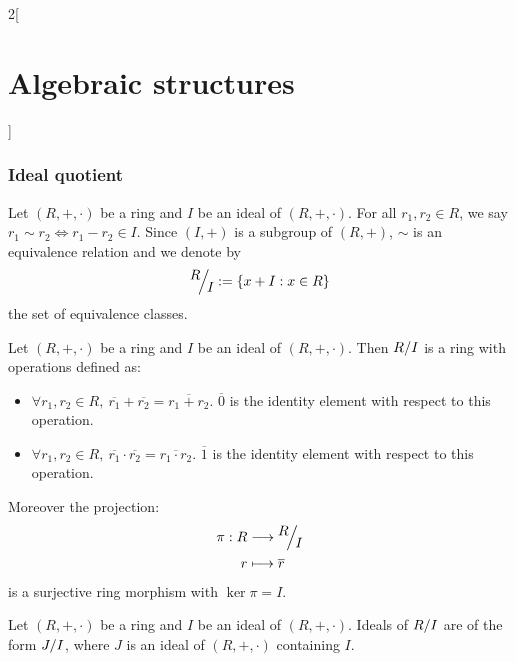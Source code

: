 \documentclass[../../../main.tex]{subfiles}
\begin{document}
\begin{multicols}{2}[\section{Algebraic structures}]
\subsubsection{Ideal quotient}
\begin{definition}
    Let $(R,+,\cdot)$ be a ring and $I$ be an ideal of $(R,+,\cdot)$. For all $r_1,r_2\in R$, we say $r_1\sim r_2\iff r_1-r_2\in I$. Since $(I,+)$ is a subgroup of $(R,+)$, $\sim$ is an equivalence relation and we denote by $$\quot{R}{I}:=\{x+I:x\in R\}$$ the set of equivalence classes.
\end{definition}
\begin{prop}
    Let $(R,+,\cdot)$ be a ring and $I$ be an ideal of $(R,+,\cdot)$. Then $\quot{R}{I}$ is a ring with operations defined as:
    \begin{itemize}
        \item $\forall r_1,r_2\in R,\ \overline{r_1}+\overline{r_2}=\overline{r_1+r_2}$. $\overline{0}$ is the identity element with respect to this operation.
        \item $\forall r_1,r_2\in R,\ \overline{r_1}\cdot\overline{r_2}=\overline{r_1\cdot r_2}$. $\overline{1}$ is the identity element with respect to this operation.
    \end{itemize}
    Moreover the projection:
    \begin{align*}
        \pi:R&\longrightarrow\quot{R}{I}\\
        r&\longmapsto\overline{r}
    \end{align*}
    is a surjective ring morphism with $\ker\pi=I$.
\end{prop}
\begin{corollary}
    Let $(R,+,\cdot)$ be a ring and $I$ be an ideal of $(R,+,\cdot)$. Ideals of $\quot{R}{I}$ are of the form $\quot{J}{I}$, where $J$ is an ideal of $(R,+,\cdot)$ containing $I$.
\end{corollary}

\end{multicols}
\end{document}
